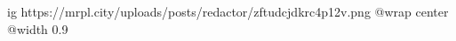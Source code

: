  
 
 
 
 

\ifcmt
  ig https://mrpl.city/uploads/posts/redactor/zftudcjdkrc4p12v.png
  @wrap center
  @width 0.9
\fi
